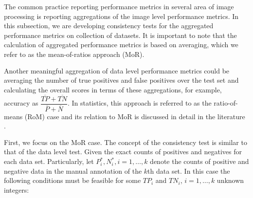 \documentclass[5p, final]{elsarticle}
\begin{document}

The common practice reporting performance metrics in several area of image processing is reporting aggregations of the image level performance metrics. In this subsection, we are developing consistency tests for the aggregated performance metrics on collection of datasets. It is important to note that the calculation of aggregated performance metrics is based on averaging, which we refer to as the mean-of-ratios approach (MoR).

Another meaningful aggregation of data level performance metrics could be averaging the number of true positives and false positives over the test set and calculating the overall scores in terms of these aggregations, for example, accuracy as $\dfrac{\overline{TP} + \overline{TN}}{\overline{P} + \overline{N}}$. In statistics, this approach is referred to as the ratio-of-means (RoM) case and its relation to MoR is discussed in detail in the literature \citep{rommor}. 

First, we focus on the MoR case. The concept of the consistency test is similar to that of the data level test. Given the exact counts of positives and negatives for each data set. Particularly, let $P_i^*, N_i^*, i=1, \dots, k$ denote the counts of positive and negative data in the manual annotation of the $k$th data set. In this case the following conditions must be feasible for some $TP_i$ and $TN_i$, $i=1, \dots, k$ unknown integers:
\end{document}
